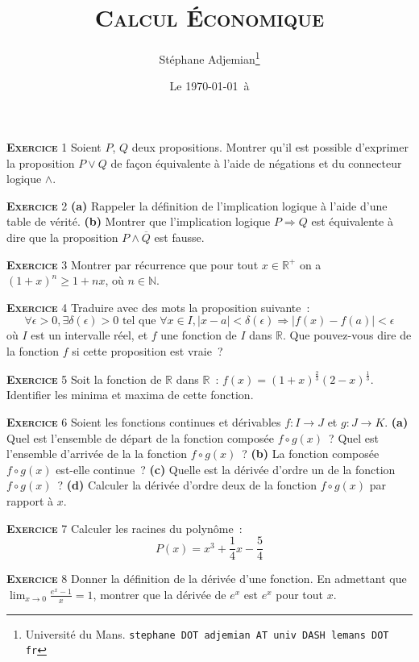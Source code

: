\documentclass[10pt,a4paper,notitlepage]{article}
\newcommand{\exercice}[1]{\textsc{\textbf{Exercice}} #1}
\begin{document}
\title{\textsc{Calcul Économique}}
\author{Stéphane Adjemian\thanks{Université du Mans. \texttt{stephane DOT adjemian AT univ DASH lemans DOT fr}}}
\date{Le \today\ à \thistime}

\maketitle

\exercice{1} Soient $P$, $Q$ deux propositions. Montrer qu'il est
possible d'exprimer la proposition $P \lor Q$ de façon équivalente à l'aide de
négations et du connecteur logique $\land$.
	
\bigskip

\exercice{2} \textbf{(a)} Rappeler la définition de l'implication
logique à l'aide d'une table de vérité. \textbf{(b)} Montrer que
l'implication logique $P \Rightarrow Q$ est équivalente à dire que la
proposition $P\land\overline{Q}$ est fausse.

\bigskip

\exercice{3} Montrer par récurrence que pour tout $x\in \mathbb R^+$ on a $(1+x)^n \geq 1+nx$, où $n\in \mathbb N$.

\bigskip

\exercice{4} Traduire avec des mots la proposition suivante :
\[
\forall \epsilon>0, \exists \delta(\epsilon)>0 \text{ tel que } \forall x \in I,  |x-a|<\delta(\epsilon) \Rightarrow |f(x)-f(a)|<\epsilon   
\]
où $I$ est un intervalle réel, et $f$ une fonction de $I$ dans
$\mathbb R$. Que pouvez-vous dire de la fonction $f$ si cette
proposition est vraie ?

\bigskip

\exercice{5} Soit la fonction de $\mathbb R$ dans $\mathbb R$ :
$f(x) = (1+x)^{\frac{2}{3}}(2-x)^{\frac{1}{3}}$. Identifier les minima
et maxima de cette fonction.
 
\bigskip

\exercice{6} Soient les fonctions continues et dérivables
$f: I\rightarrow J$ et $g: J\rightarrow K$. \textbf{(a)} Quel est
l'ensemble de départ de la fonction composée $f \circ g (x)$ ? Quel
est l'ensemble d'arrivée de la la fonction $f \circ g (x)$ ?
\textbf{(b)} La fonction composée $f \circ g (x)$ est-elle continue ?
\textbf{(c)} Quelle est la dérivée d'ordre un de la fonction
$f \circ g (x)$ ? \textbf{(d)} Calculer la dérivée d'ordre deux de la
fonction $f \circ g (x)$ par rapport à $x$.

\bigskip

\exercice{7} Calculer les racines du polynôme :
\[
P(x) = x^3 + \frac{1}{4}x - \frac{5}{4}
\]    

\bigskip

\exercice{8} Donner la définition de la dérivée d'une fonction. En admettant que $\lim_{x \rightarrow 0}\frac{e^x-1}{x} = 1$, montrer que la dérivée de $e^x$ est $e^x$ pour tout $x$.
\end{document}
